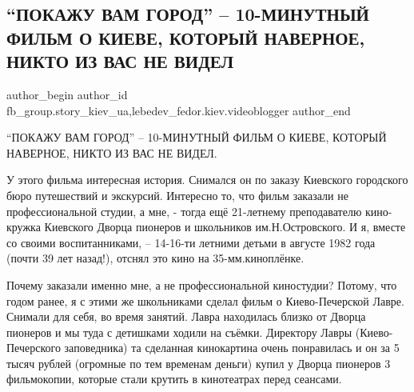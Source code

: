  
 
 
 
 
 
\subsection{\enquote{ПОКАЖУ ВАМ ГОРОД} – 10-МИНУТНЫЙ ФИЛЬМ О КИЕВЕ, КОТОРЫЙ НАВЕРНОЕ, НИКТО ИЗ ВАС НЕ ВИДЕЛ}
\label{sec:06_02_2021.fb.fb_group.story_kiev_ua.1.pokazhu_vam_gorod}
 
\ifcmt
 author_begin
   author_id fb_group.story_kiev_ua,lebedev_fedor.kiev.videoblogger
 author_end
\fi

\enquote{ПОКАЖУ ВАМ ГОРОД} – 10-МИНУТНЫЙ ФИЛЬМ О КИЕВЕ,  КОТОРЫЙ НАВЕРНОЕ, НИКТО ИЗ ВАС
НЕ ВИДЕЛ.

У этого фильма интересная история. Снимался он по заказу Киевского городского
бюро путешествий и экскурсий. Интересно то, что фильм заказали не
профессиональной студии, а мне, - тогда ещё 21-летнему преподавателю
кино-кружка Киевского Дворца пионеров и школьников им.Н.Островского. И я,
вместе со своими воспитанниками, – 14-16-ти летними детьми в августе 1982 года
(почти 39 лет назад!), отснял это кино на 35-мм.киноплёнке. 


Почему заказали именно мне, а не профессиональной киностудии? Потому, что годом
ранее, я с этими же школьниками сделал фильм о Киево-Печерской Лавре. Снимали
для себя, во время занятий. Лавра находилась близко от Дворца пионеров и мы
туда с детишками ходили на съёмки. Директору Лавры (Киево-Печерского
заповедника) та сделанная кинокартина очень понравилась и он за 5 тысяч рублей
(огромные по тем временам деньги) купил у Дворца пионеров 3 фильмокопии,
которые стали крутить в кинотеатрах перед сеансами.


